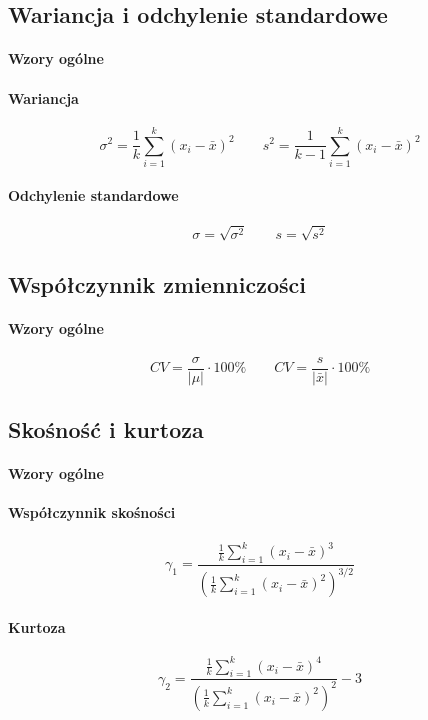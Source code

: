 \documentclass[10pt]{article}
\begin{document}
\subsection{Wariancja i odchylenie standardowe}
\paragraph{Wzory ogólne}
\paragraph{Wariancja}
\[
\sigma^{2} = \frac{1}{k} \sum_{i=1}^{k} (x_{i} - \bar{x})^{2}
\qquad
s^{2} = \frac{1}{k-1} \sum_{i=1}^{k} (x_{i} - \bar{x})^{2}
\]

\paragraph{Odchylenie standardowe}
\[
\sigma = \sqrt{\sigma^{2}}
\qquad
s = \sqrt{s^{2}}
\]

\subsection{Współczynnik zmienniczości}
\paragraph{Wzory ogólne}
\[
CV = \frac{\sigma}{|\mu|} \cdot 100\%
\qquad
CV = \frac{s}{|\bar{x}|} \cdot 100\%
\]

\subsection{Skośność i kurtoza}

\paragraph{Wzory ogólne}

\paragraph{Współczynnik skośności}
\[
\gamma_{1} = \frac{\frac{1}{k} \sum_{i=1}^{k} (x_{i} - \bar{x})^{3}}
                         {\left(\frac{1}{k} \sum_{i=1}^{k} (x_{i} - \bar{x})^{2}\right)^{3/2}}
\]

\paragraph{Kurtoza}
\[
\gamma_{2} = \frac{\frac{1}{k} \sum_{i=1}^{k} (x_{i} - \bar{x})^{4}}
                         {\left(\frac{1}{k} \sum_{i=1}^{k} (x_{i} - \bar{x})^{2}\right)^{2}}-3
\]
\end{document}
